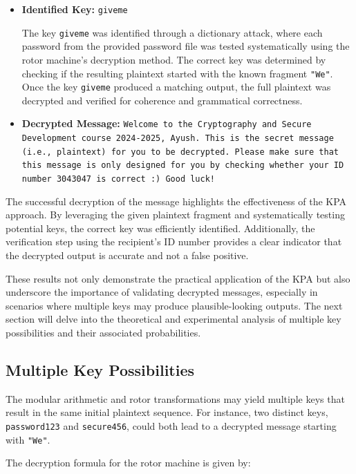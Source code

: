 \documentclass{article}
\begin{document}
\begin{itemize}
    \item \textbf{Identified Key:} \texttt{giveme}
    
    The key \texttt{giveme} was identified through a dictionary attack, where each password from the provided password file was tested systematically using the rotor machine's decryption method. The correct key was determined by checking if the resulting plaintext started with the known fragment \texttt{"We"}. Once the key \texttt{giveme} produced a matching output, the full plaintext was decrypted and verified for coherence and grammatical correctness.

    \item \textbf{Decrypted Message:} \texttt{Welcome to the Cryptography and Secure Development course 2024-2025, Ayush. This is the secret message (i.e., plaintext) for you to be decrypted. Please make sure that this message is only designed for you by checking whether your ID number 3043047 is correct :) Good luck!}

\end{itemize}

The successful decryption of the message highlights the effectiveness of the KPA approach. By leveraging the given plaintext fragment and systematically testing potential keys, the correct key was efficiently identified. Additionally, the verification step using the recipient's ID number provides a clear indicator that the decrypted output is accurate and not a false positive.

These results not only demonstrate the practical application of the KPA but also underscore the importance of validating decrypted messages, especially in scenarios where multiple keys may produce plausible-looking outputs. The next section will delve into the theoretical and experimental analysis of multiple key possibilities and their associated probabilities.


\subsection{Multiple Key Possibilities}
The modular arithmetic and rotor transformations may yield multiple keys that result in the same initial plaintext sequence. For instance, two distinct keys, \texttt{password123} and \texttt{secure456}, could both lead to a decrypted message starting with \texttt{"We"}.

The decryption formula for the rotor machine is given by:
\end{document}
